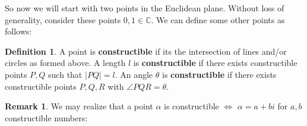\documentclass{article}
\theoremstyle{plain}
\theoremstyle{definition}
\newtheorem{defn}{Definition}
\newtheorem{rem}{Remark}
\newcommand{\C}{\mathbb{C}}
\begin{document}
\begin{center}
\end{center}
So now we will start with two points in the Euclidean plane. Without loss of generality, consider these points $0,1 \in \C$. We can define some other points as follows:
\begin{defn} A point is \textbf{constructible} if its the intersection of lines and/or circles as formed above. A length $l$ is \textbf{constructible} if there exists constructible points $P, Q$ such that $|PQ| = l$. An angle $\theta$ is \textbf{constructible} if there exists constructible points $P, Q, R$ with $\angle PQR = \theta$. 
\end{defn}

\begin{rem}
    We may realize that a point $\alpha$ is constructible $\iff$ $\alpha = a + bi$ for $a,b$ constructible numbers:

    \begin{center}
\end{center}
\end{rem}
\end{document}
